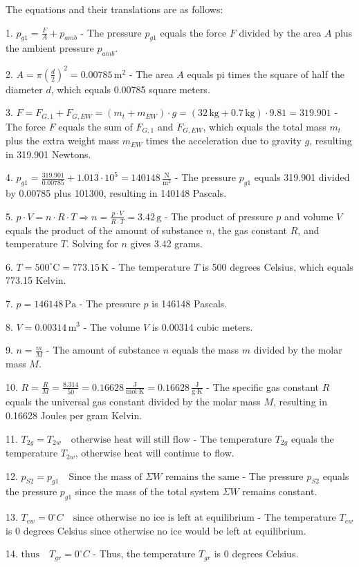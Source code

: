 The equations and their translations are as follows:

1. \( p_{g1} = \frac{F}{A} + p_{amb} \)
   - The pressure \( p_{g1} \) equals the force \( F \) divided by the area \( A \) plus the ambient pressure \( p_{amb} \).

2. \( A = \pi \left( \frac{d}{2} \right)^2 = 0.00785 \, \text{m}^2 \)
   - The area \( A \) equals pi times the square of half the diameter \( d \), which equals 0.00785 square meters.

3. \( F = F_{G,1} + F_{G,EW} = (m_t + m_{EW}) \cdot g = (32 \, \text{kg} + 0.7 \, \text{kg}) \cdot 9.81 = 319.901 \)
   - The force \( F \) equals the sum of \( F_{G,1} \) and \( F_{G,EW} \), which equals the total mass \( m_t \) plus the extra weight mass \( m_{EW} \) times the acceleration due to gravity \( g \), resulting in 319.901 Newtons.

4. \( p_{g1} = \frac{319.901}{0.00785} + 1.013 \cdot 10^5 = 140148 \, \frac{\text{N}}{\text{m}^2} \)
   - The pressure \( p_{g1} \) equals 319.901 divided by 0.00785 plus 101300, resulting in 140148 Pascals.

5. \( p \cdot V = n \cdot R \cdot T \Rightarrow n = \frac{p \cdot V}{R \cdot T} = 3.42 \, \text{g} \)
   - The product of pressure \( p \) and volume \( V \) equals the product of the amount of substance \( n \), the gas constant \( R \), and temperature \( T \). Solving for \( n \) gives 3.42 grams.

6. \( T = 500^\circ \text{C} = 773.15 \, \text{K} \)
   - The temperature \( T \) is 500 degrees Celsius, which equals 773.15 Kelvin.

7. \( p = 146148 \, \text{Pa} \)
   - The pressure \( p \) is 146148 Pascals.

8. \( V = 0.00314 \, \text{m}^3 \)
   - The volume \( V \) is 0.00314 cubic meters.

9. \( n = \frac{m}{M} \)
   - The amount of substance \( n \) equals the mass \( m \) divided by the molar mass \( M \).

10. \( R = \frac{R}{M} = \frac{8.314}{50} = 0.16628 \, \frac{\text{J}}{\text{mol} \cdot \text{K}} = 0.16628 \, \frac{\text{J}}{\text{g} \cdot \text{K}} \)
    - The specific gas constant \( R \) equals the universal gas constant divided by the molar mass \( M \), resulting in 0.16628 Joules per gram Kelvin.

11. \( T_{2g} = T_{2w} \quad \text{otherwise heat will still flow} \)
    - The temperature \( T_{2g} \) equals the temperature \( T_{2w} \), otherwise heat will continue to flow.

12. \( p_{S2} = p_{g1} \quad \text{Since the mass of } \Sigma W \text{ remains the same} \)
    - The pressure \( p_{S2} \) equals the pressure \( p_{g1} \) since the mass of the total system \( \Sigma W \) remains constant.

13. \( T_{ew} = 0^\circ C \quad \text{since otherwise no ice is left at equilibrium} \)
    - The temperature \( T_{ew} \) is 0 degrees Celsius since otherwise no ice would be left at equilibrium.

14. \( \text{thus} \quad T_{gr} = 0^\circ C \)
    - Thus, the temperature \( T_{gr} \) is 0 degrees Celsius.